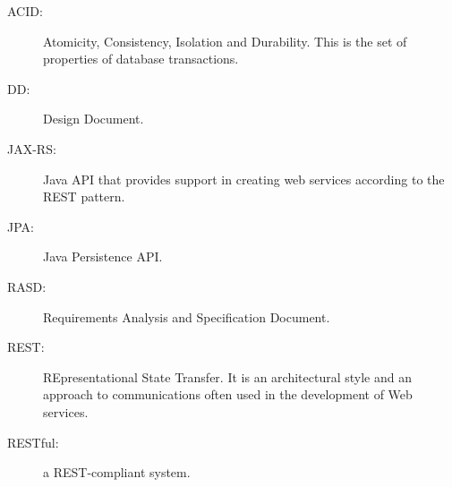 \begin{description}
\item[ACID:] Atomicity, Consistency, Isolation and Durability. This is the set of properties of database transactions. 
\item[DD:] Design Document.
\item[JAX-RS:] Java API that provides support in creating web services according to the REST pattern.
\item[JPA:] Java Persistence API.
\item[RASD:] Requirements Analysis and Specification Document.
\item[REST:] REpresentational State Transfer. It is an architectural style and an approach to communications often used in the development of Web services.
\item[RESTful:] a REST-compliant system.
\end{description}